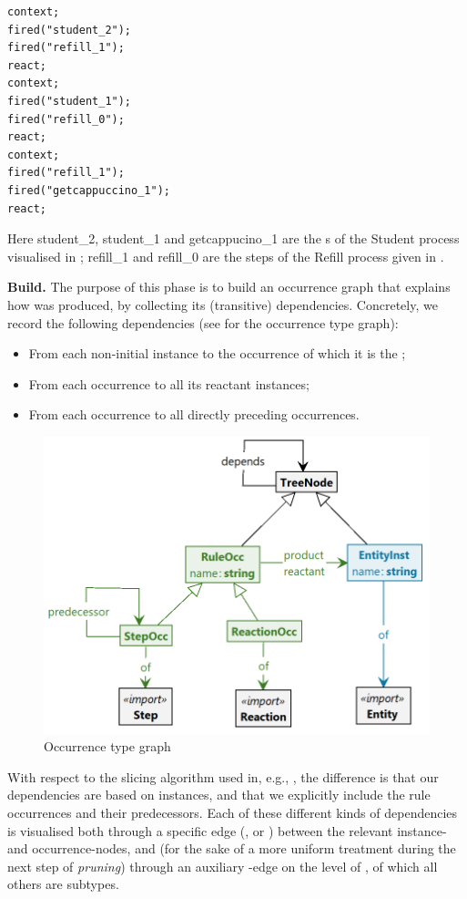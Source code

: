 \begin{center}
\begin{lstlisting}
context;
fired("student_2");
fired("refill_1");
react;
context;
fired("student_1");
fired("refill_0");
react;
context;
fired("refill_1");
fired("getcappuccino_1");
react;
\end{lstlisting}
\end{center}
%
Here \textsf{student\_2}, \textsf{student\_1} and \textsf{getcappucino\_1} are the \Step{}s of the \textsf{Student} process visualised in ; \textsf{refill\_1} and \textsf{refill\_0} are the steps of the \textsf{Refill} process given in .

\medskip\noindent\textbf{Build.}
%
The purpose of this phase is to build an occurrence graph that explains how \Forbidden was produced, by collecting its (transitive) dependencies. Concretely, we record the following dependencies (see  for the occurrence type graph):
\begin{itemize}
\item From each non-initial \Entity instance to the \Rule occurrence of which it is the \product;
\item From each \Rule occurrence to all its reactant \Entity instances;
\item From each \Step occurrence to all directly preceding \Step occurrences.
\end{itemize}
%
\begin{figure}
\centering
\includegraphics[scale=.2]{figs/occur-type}
\caption{Occurrence type graph}
\label{fig:occur-type}
\end{figure}
%
With respect to the slicing algorithm used in, e.g., \cite{datamod2023,DBLP:journals/nc/BrodoBF24}, the difference is that our dependencies are based on instances, and that we explicitly include the rule occurrences and their predecessors. Each of these different kinds of dependencies is visualised both through a specific edge (\product, \reactant or \predecessor) between the relevant instance- and occurrence-nodes, and (for the sake of a more uniform treatment during the next step of \emph{pruning}) through an auxiliary \depends-edge on the level of \TreeNode, of which all others are subtypes.

